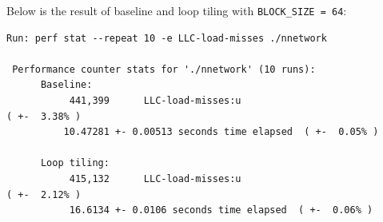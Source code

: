\documentclass[a4paper, DIV12, headsepline]{scrartcl}
\begin{document}
\begin{enumerate}[label=\alph*)]
Below is the result of baseline and loop tiling with \verb|BLOCK_SIZE = 64|:

\begin{verbatim}  
Run: perf stat --repeat 10 -e LLC-load-misses ./nnetwork

 Performance counter stats for './nnetwork' (10 runs):
      Baseline:
           441,399      LLC-load-misses:u                                             ( +-  3.38% )
          10.47281 +- 0.00513 seconds time elapsed  ( +-  0.05% )

      Loop tiling:
           415,132      LLC-load-misses:u                                             ( +-  2.12% )
           16.6134 +- 0.0106 seconds time elapsed  ( +-  0.06% )
\end{verbatim}

\end{enumerate}
%
%
%
\end{document}
